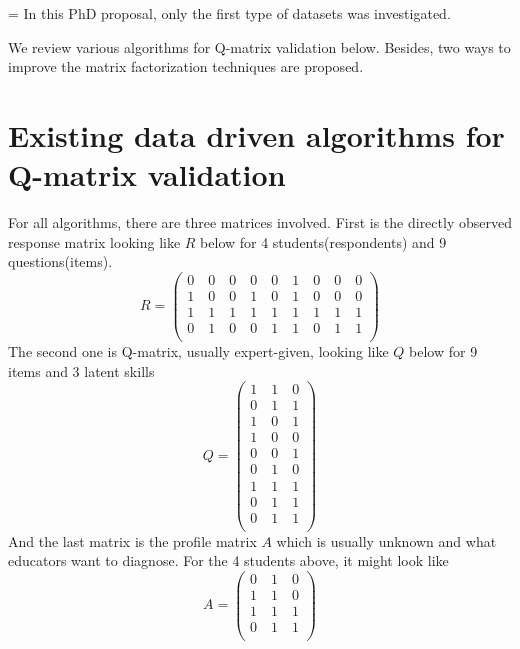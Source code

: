 \documentclass[11pt]{article}
\begin{document}
\parskip = \baselineskip
In this PhD proposal, only the first type of datasets was investigated.

We review various algorithms for Q-matrix validation below. Besides, two ways to improve the matrix factorization techniques are proposed. 

\section{Existing data driven algorithms for Q-matrix validation}

For all algorithms, there are three matrices involved. First is the directly observed response matrix looking like $R$ below for 4 students(respondents) and 9 questions(items).
$$R=\begin{pmatrix}
0\quad 0\quad 0\quad 0\quad 0\quad 1\quad 0\quad 0\quad 0\\
1\quad 0\quad 0\quad 1\quad 0\quad 1\quad 0\quad 0\quad 0\\
1\quad 1\quad 1\quad 1\quad 1\quad 1\quad 1\quad 1\quad 1\\
0\quad 1\quad 0\quad 0\quad 1\quad 1\quad 0\quad 1\quad 1\\
\end{pmatrix}$$
The second one is Q-matrix, usually expert-given, looking like $Q$ below for 9 items and 3 latent skills
$$Q=\begin{pmatrix}
1\quad 1\quad 0\\
0\quad 1\quad 1\\
1\quad 0\quad 1\\
1\quad 0\quad 0\\
0\quad 0\quad 1\\
0\quad 1\quad 0\\
1\quad 1\quad 1\\
0\quad 1\quad 1\\
0\quad 1\quad 1\\
\end{pmatrix}$$
And the last matrix is the profile matrix $A$ which is usually unknown and what educators want to diagnose. For the 4 students above, it might look like
$$A=\begin{pmatrix}
0\quad 1\quad 0\\
1\quad 1\quad 0\\
1\quad 1\quad 1\\
0\quad 1\quad 1\\
\end{pmatrix}$$
\end{document}
